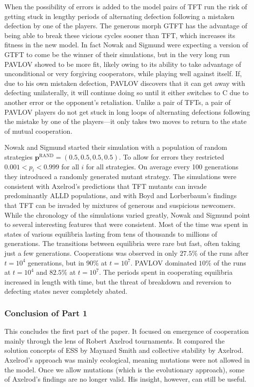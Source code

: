 When the possibility of errors is added to the model pairs of TFT run the risk of getting stuck in lengthy periods of alternating defection following a mistaken defection by one of the players. The generous morph GTFT has the advantage of being able to break these vicious cycles sooner than TFT, which increases its fitness in the new model. In fact Nowak and Sigmund were expecting a version of GTFT to come be the winner of their simulations, but in the very long run PAVLOV showed to be more fit, likely owing to its ability to take advantage of unconditional or very forgiving cooperators, while playing well against itself. If, due to his own mistaken defection, PAVLOV discovers that it can get away with defecting unilaterally, it will continue doing so until it either switches to C due to another error or the opponent's retaliation. Unlike a pair of TFTs, a pair of PAVLOV players do not get stuck in long loops of alternating defections following the mistake by one of the players---it only takes two moves to return to the state of mutual cooperation.

Nowak and Sigmund started their simulation with a population of random strategies $\mathbf{p}^{\textrm{RAND}} = (0.5, 0.5, 0.5, 0.5)$. To allow for errors they restricted $0.001 < p_i < 0.999$ for all $i$ for all strategies. On average every 100 generations they introduced a randomly generated mutant strategy. The simulations were consistent with Axelrod's predictions that TFT mutants can invade predominantly ALLD populations, and with Boyd and Lorberbaum's findings that TFT can be invaded by mixtures of generous and suspicious newcomers. While the chronology of the simulations varied greatly, Nowak and Sigmund point to several interesting features that were consistent. Most of the time was spent in states of various equilibria lasting from tens of thousands to millions of generations. The transitions between equilibria were rare but fast, often taking just a few generations. Cooperations was observed in only $27.5\%$ of the runs after $t = 10^4$ generations, but in $90\%$ at $t=10^7$. PAVLOV dominated $10\%$ of the runs at $t = 10^4$ and $82.5\%$ at $t=10^7$. The periods spent in cooperating equilibria increased in length with time, but the threat of breakdown and reversion to defecting states never completely abated.

\subsubsection{Conclusion of Part 1}
This concludes the first part of the paper. It focused on emergence of cooperation mainly through the lens of Robert Axelrod tournaments. It compared the solution concepts of ESS by Maynard Smith and collective stability by Axelrod. Axelrod's approach was mainly ecological, meaning mutations were not allowed in the model. Once we allow mutations (which is the evolutionary approach), some of Axelrod's findings are no longer valid. His insight, however, can still be useful.

